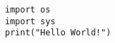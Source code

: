 \documentclass[varwidth]{standalone}
\begin{document}
\begin{verbatim}
import os
import sys
print("Hello World!")
\end{verbatim}
\end{document}
